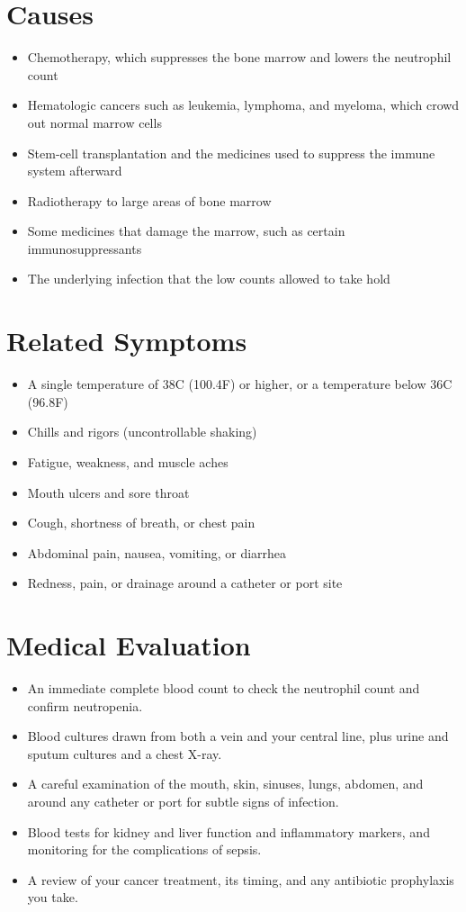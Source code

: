 \section*{Causes}
\begin{itemize}
  \item Chemotherapy, which suppresses the bone marrow and lowers the neutrophil count
  \item Hematologic cancers such as leukemia, lymphoma, and myeloma, which crowd out normal marrow cells
  \item Stem-cell transplantation and the medicines used to suppress the immune system afterward
  \item Radiotherapy to large areas of bone marrow
  \item Some medicines that damage the marrow, such as certain immunosuppressants
  \item The underlying infection that the low counts allowed to take hold
\end{itemize}

\section*{Related Symptoms}
\begin{itemize}
  \item A single temperature of 38\textdegree{}C (100.4\textdegree{}F) or higher, or a temperature below 36\textdegree{}C (96.8\textdegree{}F)
  \item Chills and rigors (uncontrollable shaking)
  \item Fatigue, weakness, and muscle aches
  \item Mouth ulcers and sore throat
  \item Cough, shortness of breath, or chest pain
  \item Abdominal pain, nausea, vomiting, or diarrhea
  \item Redness, pain, or drainage around a catheter or port site
\end{itemize}

\section*{Medical Evaluation}
\begin{itemize}
  \item An immediate complete blood count to check the neutrophil count and confirm neutropenia.
  \item Blood cultures drawn from both a vein and your central line, plus urine and sputum cultures and a chest X-ray.
  \item A careful examination of the mouth, skin, sinuses, lungs, abdomen, and around any catheter or port for subtle signs of infection.
  \item Blood tests for kidney and liver function and inflammatory markers, and monitoring for the complications of sepsis.
  \item A review of your cancer treatment, its timing, and any antibiotic prophylaxis you take.
\end{itemize}

